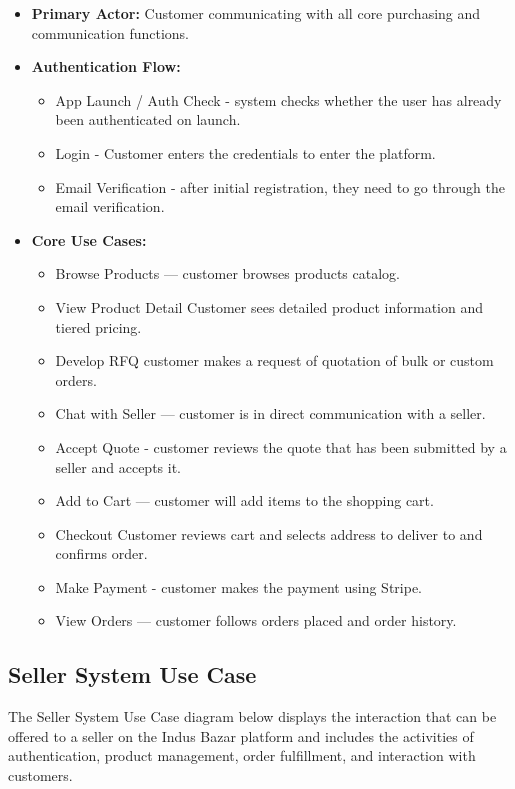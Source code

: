 \begin{itemize}
    \item \textbf{Primary Actor:} Customer communicating with all core purchasing and communication functions.

    \item \textbf{Authentication Flow:}
    \begin{itemize}
        \item App Launch / Auth Check - system checks whether the user has already been authenticated on launch.
        \item Login - Customer enters the credentials to enter the platform.
        \item Email Verification - after initial registration, they need to go through the email verification.
    \end{itemize}

    \item \textbf{Core Use Cases:}
    \begin{itemize}
        \item Browse Products — customer browses products catalog.
        \item View Product Detail Customer sees detailed product information and tiered pricing.
        \item Develop RFQ customer makes a request of quotation of bulk or custom orders.
        \item Chat with Seller — customer is in direct communication with a seller.
        \item Accept Quote - customer reviews the quote that has been submitted by a seller and accepts it.
        \item Add to Cart — customer will add items to the shopping cart.
        \item Checkout Customer reviews cart and selects address to deliver to and confirms order.
        \item Make Payment - customer makes the payment using Stripe.
        \item View Orders — customer follows orders placed and order history.
    \end{itemize}
\end{itemize}

\subsection{Seller System Use Case}

The Seller System Use Case diagram below displays the interaction that can be offered to a seller on the Indus Bazar platform and includes the activities of authentication, product management, order fulfillment, and interaction with customers.

